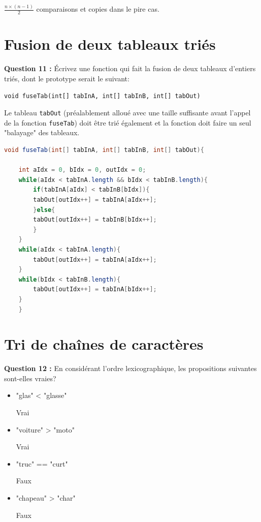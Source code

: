 \documentclass[iutinfo,a4paper,nocorrections,10pt]{ustl-tdtp}
\begin{document}
\begin{correction}

{\color{red}

$\frac{n \times (n-1)}{2}$ comparaisons et copies dans le pire cas.

}
\end{correction}

\section{Fusion de deux tableaux triés}

\textbf{Question 11 :} Écrivez une fonction qui fait la fusion de deux tableaux d'entiers triés, dont le prototype serait le suivant:

\texttt{void fuseTab(int[] tabInA, int[] tabInB, int[] tabOut)}

Le tableau \texttt{tabOut} (préalablement alloué avec une taille suffisante avant l'appel de la fonction \texttt{fuseTab}) doit être trié également et la fonction doit faire un seul "balayage" des tableaux.

\begin{correction}

{\color{red}

\begin{lstlisting}[language=java]
  void fuseTab(int[] tabInA, int[] tabInB, int[] tabOut){

	int aIdx = 0, bIdx = 0, outIdx = 0;
	while(aIdx < tabInA.length && bIdx < tabInB.length){
	    if(tabInA[aIdx] < tabInB[bIdx]){
		tabOut[outIdx++] = tabInA[aIdx++];
	    }else{
		tabOut[outIdx++] = tabInB[bIdx++];
	    }
	}
	while(aIdx < tabInA.length){
	    tabOut[outIdx++] = tabInA[aIdx++]; 
	}
	while(bIdx < tabInB.length){
	    tabOut[outIdx++] = tabInA[bIdx++]; 
	}
    }

\end{lstlisting}

}
\end{correction}
\section{Tri de chaînes de caractères} 


\textbf{Question 12 :} En considérant l'ordre lexicographique, les propositions suivantes sont-elles vraies?

\begin{itemize}
\item[] "glas" < "glasse" \begin{correction}{\color{red}Vrai}\end{correction}
\item[] "voiture" > "moto"   \begin{correction}{\color{red}Vrai}\end{correction}
\item[] "truc" == "curt" \begin{correction}{\color{red}Faux}\end{correction}
\item[] "chapeau" > "char" \begin{correction}{\color{red}Faux}\end{correction}
\end{itemize}
 
\end{document}

